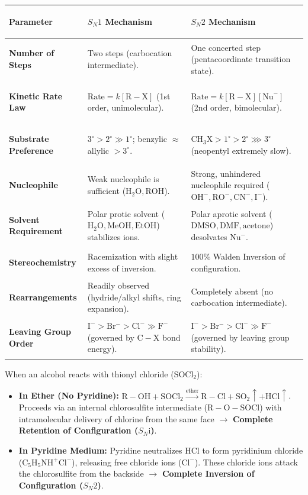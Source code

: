 \documentclass[10pt,twoside,openright]{book}
\begin{document}
\begin{center}
\scriptsize
\begin{tabularx}{\linewidth}{|>{\bfseries\raggedright\arraybackslash}p{2.8cm}|L|L|}
\hline
\textbf{Parameter} & \textbf{$S_N1$ Mechanism} & \textbf{$S_N2$ Mechanism} \\
\hline
\textbf{Number of Steps} & Two steps (carbocation intermediate). & One concerted step (pentacoordinate transition state). \\
\hline
\textbf{Kinetic Rate Law} & $\text{Rate} = k[\mathrm{R-X}]$ (1st order, unimolecular). & $\text{Rate} = k[\mathrm{R-X}][\mathrm{Nu}^-]$ (2nd order, bimolecular). \\
\hline
\textbf{Substrate Preference} & $3^\circ > 2^\circ \gg 1^\circ$; benzylic $\approx$ allylic $> 3^\circ$. & $\mathrm{CH_3X} > 1^\circ > 2^\circ \ggg 3^\circ$ (neopentyl extremely slow). \\
\hline
\textbf{Nucleophile} & Weak nucleophile is sufficient ($\mathrm{H_2O, ROH}$). & Strong, unhindered nucleophile required ($\mathrm{OH^-, RO^-, CN^-, I^-}$). \\
\hline
\textbf{Solvent Requirement} & Polar protic solvent ($\mathrm{H_2O, MeOH, EtOH}$) stabilizes ions. & Polar aprotic solvent ($\mathrm{DMSO, DMF, \text{acetone}}$) desolvates $\mathrm{Nu}^-$. \\
\hline
\textbf{Stereochemistry} & Racemization with slight excess of inversion. & $100\%$ Walden Inversion of configuration. \\
\hline
\textbf{Rearrangements} & Readily observed (hydride/alkyl shifts, ring expansion). & Completely absent (no carbocation intermediate). \\
\hline
\textbf{Leaving Group Order} & $\mathrm{I^- > Br^- > Cl^- \gg F^-}$ (governed by $\mathrm{C-X}$ bond energy). & $\mathrm{I^- > Br^- > Cl^- \gg F^-}$ (governed by leaving group stability). \\
\hline
\end{tabularx}
\end{center}

\begin{ncertbox}
When an alcohol reacts with thionyl chloride ($\mathrm{SOCl_2}$):
\begin{itemize}
  \item \textbf{In Ether (No Pyridine):} $\mathrm{R-OH} + \mathrm{SOCl_2} \xrightarrow{\text{ether}} \mathrm{R-Cl} + \mathrm{SO_2}\uparrow + \mathrm{HCl}\uparrow$. Proceeds via an internal chlorosulfite intermediate ($\mathrm{R-O-SOCl}$) with intramolecular delivery of chlorine from the same face $\to$ \textbf{Complete Retention of Configuration ($S_N\mathrm{i}$)}.
  \item \textbf{In Pyridine Medium:} Pyridine neutralizes $\mathrm{HCl}$ to form pyridinium chloride ($\mathrm{C_5H_5NH^+Cl^-}$), releasing free chloride ions ($\mathrm{Cl^-}$). These chloride ions attack the chlorosulfite from the backside $\to$ \textbf{Complete Inversion of Configuration ($S_N2$)}.
\end{itemize}
\end{ncertbox}
\end{document}
